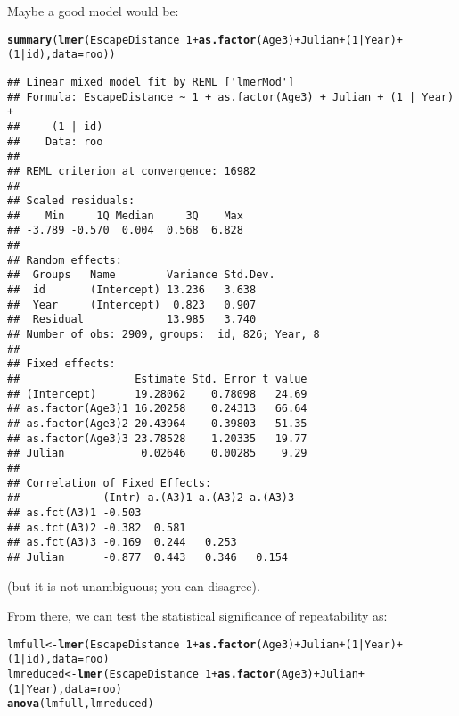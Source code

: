 \documentclass[12pt,a4paper]{scrartcl}\usepackage[]{graphicx}\usepackage[]{color}
\makeatletter
\newcommand{\hlnum}[1]{\textcolor[rgb]{0.686,0.059,0.569}{#1}}%
\newcommand{\hlopt}[1]{\textcolor[rgb]{0,0,0}{#1}}%
\newcommand{\hlstd}[1]{\textcolor[rgb]{0.345,0.345,0.345}{#1}}%
\newcommand{\hlkwb}[1]{\textcolor[rgb]{0.69,0.353,0.396}{#1}}%
\newcommand{\hlkwc}[1]{\textcolor[rgb]{0.333,0.667,0.333}{#1}}%
\newcommand{\hlkwd}[1]{\textcolor[rgb]{0.737,0.353,0.396}{\textbf{#1}}}%
\newenvironment{kframe}{%
 \def\at@end@of@kframe{}%
 \ifinner\ifhmode%
  \def\at@end@of@kframe{\end{minipage}}%
  \begin{minipage}{\columnwidth}%
 \fi\fi%
 \def\FrameCommand##1{\hskip\@totalleftmargin \hskip-\fboxsep
 \colorbox{shadecolor}{##1}\hskip-\fboxsep
     \hskip-\linewidth \hskip-\@totalleftmargin \hskip\columnwidth}%
 \MakeFramed {\advance\hsize-\width
   \@totalleftmargin\z@ \linewidth\hsize
   \@setminipage}}%
 {\par\unskip\endMakeFramed%
 \at@end@of@kframe}
\newenvironment{knitrout}{}{} %
\makeatother
\begin{document}
\begin{Answer}
Maybe a good model would be:
\begin{knitrout}
\color{fgcolor}\begin{kframe}
\begin{alltt}
\hlkwd{summary}\hlstd{(}\hlkwd{lmer}\hlstd{(EscapeDistance} \hlopt{~} \hlnum{1} \hlopt{+} \hlkwd{as.factor}\hlstd{(Age3)} \hlopt{+} \hlstd{Julian} \hlopt{+} \hlstd{(}\hlnum{1}\hlopt{|}\hlstd{Year)} \hlopt{+} \hlstd{(}\hlnum{1}\hlopt{|}\hlstd{id) ,} \hlkwc{data}\hlstd{=roo))}
\end{alltt}
\begin{verbatim}
## Linear mixed model fit by REML ['lmerMod']
## Formula: EscapeDistance ~ 1 + as.factor(Age3) + Julian + (1 | Year) +  
##     (1 | id)
##    Data: roo
## 
## REML criterion at convergence: 16982
## 
## Scaled residuals: 
##    Min     1Q Median     3Q    Max 
## -3.789 -0.570  0.004  0.568  6.828 
## 
## Random effects:
##  Groups   Name        Variance Std.Dev.
##  id       (Intercept) 13.236   3.638   
##  Year     (Intercept)  0.823   0.907   
##  Residual             13.985   3.740   
## Number of obs: 2909, groups:  id, 826; Year, 8
## 
## Fixed effects:
##                  Estimate Std. Error t value
## (Intercept)      19.28062    0.78098   24.69
## as.factor(Age3)1 16.20258    0.24313   66.64
## as.factor(Age3)2 20.43964    0.39803   51.35
## as.factor(Age3)3 23.78528    1.20335   19.77
## Julian            0.02646    0.00285    9.29
## 
## Correlation of Fixed Effects:
##             (Intr) a.(A3)1 a.(A3)2 a.(A3)3
## as.fct(A3)1 -0.503                        
## as.fct(A3)2 -0.382  0.581                 
## as.fct(A3)3 -0.169  0.244   0.253         
## Julian      -0.877  0.443   0.346   0.154
\end{verbatim}
\end{kframe}
\end{knitrout}
(but it is not unambiguous; you can disagree).

From there, we can test the statistical significance of repeatability as:
\begin{knitrout}
\color{fgcolor}\begin{kframe}
\begin{alltt}
\hlstd{lmfull} \hlkwb{<-} \hlkwd{lmer}\hlstd{(EscapeDistance} \hlopt{~} \hlnum{1} \hlopt{+} \hlkwd{as.factor}\hlstd{(Age3)} \hlopt{+} \hlstd{Julian} \hlopt{+} \hlstd{(}\hlnum{1}\hlopt{|}\hlstd{Year)} \hlopt{+} \hlstd{(}\hlnum{1}\hlopt{|}\hlstd{id) ,} \hlkwc{data}\hlstd{=roo)}
\hlstd{lmreduced} \hlkwb{<-} \hlkwd{lmer}\hlstd{(EscapeDistance} \hlopt{~} \hlnum{1} \hlopt{+} \hlkwd{as.factor}\hlstd{(Age3)} \hlopt{+} \hlstd{Julian} \hlopt{+} \hlstd{(}\hlnum{1}\hlopt{|}\hlstd{Year) ,} \hlkwc{data}\hlstd{=roo)}
\hlkwd{anova}\hlstd{(lmfull, lmreduced)}
\end{alltt}



\end{kframe}
\end{knitrout}
\end{Answer}
\end{document}
